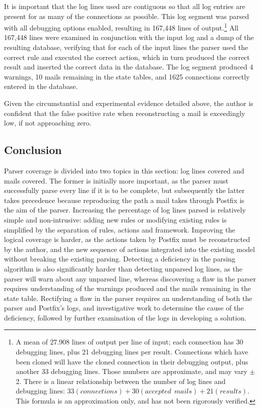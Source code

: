 \documentclass[a4paper,12pt,draft]{article}
\begin{document}
It is important that the log lines used are contiguous so that all log
entries are present for as many of the connections as possible.  This log
segment was parsed with all debugging options enabled, resulting in 167,448
lines of output.\footnote{A mean of 27.908 lines of output per line of
input; each connection has 30 debugging lines, plus 21 debugging lines per
result.  Connections which have been cloned will have the cloned connection
in their debugging output, plus another 33 debugging lines.  Those numbers
are approximate, and may vary $\pm{}$ 2.  There is a linear relationship
between the number of log lines and debugging lines: $33(connections) +
30(accepted~~mails) + 21(results)$.  This formula is an approximation only,
and has not been rigorously verified.}  All 167,448 lines were examined in
conjunction with the input log and a dump of the resulting database,
verifying that for each of the input lines the parser used the correct rule
and executed the correct action, which in turn produced the correct result
and inserted the correct data in the database.  The log segment produced 4
warnings, 10 mails remaining in the state tables, and 1625 connections
correctly entered in the database.

Given the circumstantial and experimental evidence detailed above, the
author is confident that the false positive rate when reconstructing a mail
is exceedingly low, if not approaching zero.

\subsection{Conclusion}

Parser coverage is divided into two topics in this section: log lines
covered and mails covered.  The former is initially more important, as the
parser must successfully parse every line if it is to be complete, but
subsequently the latter takes precedence because reproducing the path a
mail takes through Postfix is the aim of the parser.  Increasing the
percentage of log lines parsed is relatively simple and non-intrusive:
adding new rules or modifying existing rules is simplified by the
separation of rules, actions and framework.  Improving the logical coverage
is harder, as the actions taken by Postfix must be reconstructed by the
author, and the new sequence of actions integrated into the existing model
without breaking the existing parsing.  Detecting a deficiency in the
parsing algorithm is also significantly harder than detecting unparsed log
lines, as the parser will warn about any unparsed line, whereas discovering
a flaw in the parser requires understanding of the warnings produced and
the mails remaining in the state table.  Rectifying a flaw in the parser
requires an understanding of both the parser and Postfix's logs, and
investigative work to determine the cause of the deficiency, followed by
further examination of the logs in developing a solution.
\end{document}
